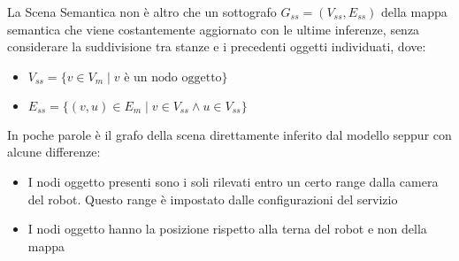 La Scena Semantica non è altro che un sottografo $G_{ss} = (V_{ss}, E_{ss})$ della mappa semantica che viene costantemente aggiornato con le ultime inferenze, senza considerare la suddivisione tra stanze e i precedenti oggetti individuati, dove:
\begin{itemize}
  \item $V_{ss} = \{v \in V_m \mid v \text{ è un nodo oggetto} \}$
  \item $E_{ss} = \{(v,u) \in E_m \mid v \in V_{ss} \wedge u \in V_{ss} \}$
\end{itemize}
In poche parole è il grafo della scena direttamente inferito dal modello seppur con alcune differenze:
\begin{itemize}
  \item I nodi oggetto presenti sono i soli rilevati entro un certo range dalla camera del robot. Questo range è impostato dalle configurazioni del servizio
  \item I nodi oggetto hanno la posizione rispetto alla terna del robot e non della mappa
\end{itemize}



